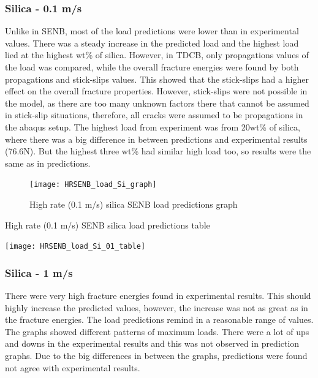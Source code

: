 \documentclass[numbers=noendperiod,chapterprefix=on]{icldt} %
\begin{document}
{\subsubsection{Silica - 0.1 m/s}

Unlike in SENB, most of the load predictions were lower than in experimental values. There was a steady increase in the predicted load and the highest load lied at the highest wt\% of silica. However, in TDCB, only propagations values of the load was compared, while the overall fracture energies were found by both propagations and stick-slips values. This showed that the stick-slips had a higher effect on the overall fracture properties. However, stick-slips were not possible in the model, as there are too many unknown factors there that cannot be assumed in stick-slip situations, therefore, all cracks were assumed to be propagations in the abaqus setup.
The highest load from experiment was from 20wt\% of silica, where there was a big difference in between predictions and experimental results (76.6N). But the highest three wt\% had similar high load too, so results were the same as in predictions.

\begin{figure}[!hp]
   \centering
   \texttt{[image: HRSENB\_load\_Si\_graph]}\label{HRSENB_load_Si_graph}
   \caption{High rate (0.1 m/s) silica SENB load predictions graph}
   \end{figure}
  \FloatBarrier
  
  \begin{table}
     \centering
     \caption{High rate (0.1 m/s) SENB silica load predictions table}\label{HRSENB_load_Si_01_table}
     \texttt{[image: HRSENB\_load\_Si\_01\_table]}
     \end{table}
     \FloatBarrier      

\subsubsection{Silica - 1 m/s}
There were very high fracture energies found in experimental results. This should highly increase the predicted values, however, the increase was not as great as in the fracture energies. The load predictions remind in a reasonable range of values. 
The graphs showed different patterns of maximum loads. There were a lot of ups and downs in the experimental results and this was not observed in prediction graphs.
Due to the big differences in between the graphs, predictions were found not agree with experimental results.

}
\end{document}
